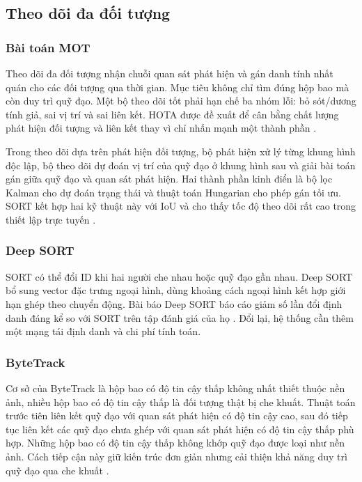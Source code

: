 \subsection{Theo dõi đa đối tượng}
\subsubsection{Bài toán MOT}
Theo dõi đa đối tượng nhận chuỗi quan sát phát hiện và gán danh tính nhất quán cho các đối tượng qua thời gian. Mục tiêu không chỉ tìm đúng hộp bao mà còn duy trì quỹ đạo. Một bộ theo dõi tốt phải hạn chế ba nhóm lỗi: bỏ sót/dương tính giả, sai vị trí và sai liên kết. HOTA được đề xuất để cân bằng chất lượng phát hiện đối tượng và liên kết thay vì chỉ nhấn mạnh một thành phần \cite{hota}.

Trong theo dõi dựa trên phát hiện đối tượng, bộ phát hiện xử lý từng khung hình độc lập, bộ theo dõi dự đoán vị trí của quỹ đạo ở khung hình sau và giải bài toán gán giữa quỹ đạo và quan sát phát hiện. Hai thành phần kinh điển là bộ lọc Kalman cho dự đoán trạng thái và thuật toán Hungarian cho phép gán tối ưu. SORT kết hợp hai kỹ thuật này với IoU và cho thấy tốc độ theo dõi rất cao trong thiết lập trực tuyến \cite{sort}.

\subsubsection{Deep SORT}
SORT có thể đổi ID khi hai người che nhau hoặc quỹ đạo gần nhau. Deep SORT bổ sung vector đặc trưng ngoại hình, dùng khoảng cách ngoại hình kết hợp giới hạn ghép theo chuyển động. Bài báo Deep SORT báo cáo giảm số lần đổi định danh đáng kể so với SORT trên tập đánh giá của họ \cite{deepsort}. Đổi lại, hệ thống cần thêm một mạng tái định danh và chi phí tính toán.

\subsubsection{ByteTrack}
Cơ sở của ByteTrack là hộp bao có độ tin cậy thấp không nhất thiết thuộc nền ảnh, nhiều hộp bao có độ tin cậy thấp là đối tượng thật bị che khuất. Thuật toán trước tiên liên kết quỹ đạo với quan sát phát hiện có độ tin cậy cao, sau đó tiếp tục liên kết các quỹ đạo chưa ghép với quan sát phát hiện có độ tin cậy thấp phù hợp. Những hộp bao có độ tin cậy thấp không khớp quỹ đạo được loại như nền ảnh. Cách tiếp cận này giữ kiến trúc đơn giản nhưng cải thiện khả năng duy trì quỹ đạo qua che khuất \cite{bytetrack}.

